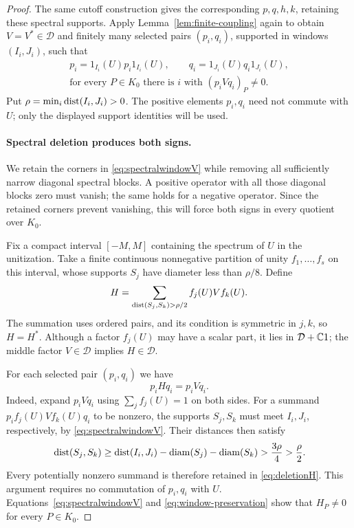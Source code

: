 \begin{proof}
The same cutoff construction gives the corresponding $p,q,h,k$,
retaining these spectral supports.  Apply
Lemma~\ref{lem:finite-coupling} again to obtain
$V=V^*\in\mathcal D$ and finitely many selected pairs
$(p_i,q_i)$, supported in windows $(I_i,J_i)$, such that
\begin{equation}\label{eq:spectralwindowV}
 \begin{gathered}
 p_i=1_{I_i}(U)p_i1_{I_i}(U),\qquad
 q_i=1_{J_i}(U)q_i1_{J_i}(U),\\
 \text{for every }P\in K_0\text{ there is }i
 \text{ with }(p_iVq_i)_P\ne0.
 \end{gathered}
\end{equation}
Put $\rho=\min_i\operatorname{dist}(I_i,J_i)>0$.
The positive elements $p_i,q_i$ need not commute with $U$;
only the displayed support identities will be used.

\paragraph{Spectral deletion produces both signs.}
We retain the corners in \eqref{eq:spectralwindowV} while removing
all sufficiently narrow diagonal spectral blocks.  A positive operator
with all those diagonal blocks zero must vanish; the same holds for
a negative operator.  Since the retained corners prevent vanishing,
this will force both signs in every quotient over $K_0$.

Fix a compact interval $[-M,M]$ containing the spectrum of $U$
in the unitization.  Take a finite continuous nonnegative
partition of unity $f_1,\ldots,f_s$ on this interval, whose
supports $S_j$ have diameter less than $\rho/8$.
Define
\begin{equation}\label{eq:deletionH}
 H=\sum_{\operatorname{dist}(S_j,S_k)>\rho/2}
       f_j(U)Vf_k(U).
\end{equation}
The summation uses ordered pairs, and its condition is symmetric
in $j,k$, so $H=H^*$.  Although a factor $f_j(U)$ may have a
scalar part, it lies in $\mathcal D+\mathbb C1$; the middle
factor $V\in\mathcal D$ implies $H\in\mathcal D$.

For each selected pair $(p_i,q_i)$ we have
\begin{equation}\label{eq:window-preservation}
 p_iHq_i=p_iVq_i.
\end{equation}
Indeed, expand $p_iVq_i$ using $\sum_jf_j(U)=1$ on both sides.
For a summand $p_if_j(U)Vf_k(U)q_i$ to be nonzero, the supports
$S_j,S_k$ must meet $I_i,J_i$, respectively, by
\eqref{eq:spectralwindowV}.  Their distances then satisfy
\[
 \operatorname{dist}(S_j,S_k)
 \ge\operatorname{dist}(I_i,J_i)
       -\operatorname{diam}(S_j)-\operatorname{diam}(S_k)
 >\frac{3\rho}{4}>\frac\rho2.
\]
Every potentially nonzero summand is therefore retained in
\eqref{eq:deletionH}.  This argument requires no commutation of
$p_i,q_i$ with $U$.  Equations~\eqref{eq:spectralwindowV} and
\eqref{eq:window-preservation} show that $H_P\ne0$ for every
$P\in K_0$.


\end{proof}
